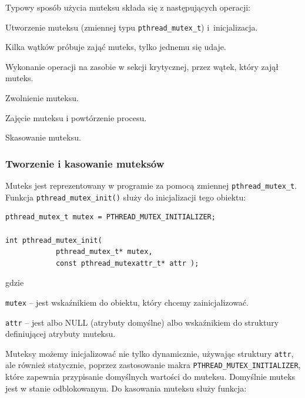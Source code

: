 Typowy sposób użycia muteksu składa się z następujących operacji: 

\begin{myenumerate} 
\item Utworzenie muteksu (zmiennej typu \lstinline[style=MyCStyle]{pthread_mutex_t}) i~inicjalizacja.
\item Kilka wątków próbuje zająć muteks, tylko jednemu się udaje. 
\item Wykonanie operacji na zasobie w sekcji krytycznej, przez wątek, który zajął muteks. 
\item Zwolnienie muteksu.
\item Zajęcie muteksu i powtórzenie procesu.
\item Skasowanie muteksu.
\end{myenumerate} 

\subsubsection{Tworzenie i kasowanie muteksów}

Muteks jest reprezentowany w programie za pomocą zmiennej \lstinline[style=MyCStyle]{pthread_mutex_t}. Funkcja \lstinline[style=MyCStyle]{pthread_mutex_init()} służy do inicjalizacji tego obiektu:

\begin{lstlisting}[style=MyCStyle]
pthread_mutex_t mutex = PTHREAD_MUTEX_INITIALIZER;

int pthread_mutex_init(
            pthread_mutex_t* mutex,
            const pthread_mutexattr_t* attr );
\end{lstlisting}


gdzie 
\begin{myitemize}
\item \lstinline[style=MyCStyle]{mutex} -- jest wskaźnikiem do obiektu, który chcemy zainicjalizować. 
\item \lstinline[style=MyCStyle]{attr} -- jest albo NULL (atrybuty domyślne) albo wskaźnikiem do struktury definiującej atrybuty muteksu.  
\end{myitemize}

Muteksy możemy inicjalizować nie tylko dynamicznie, używając struktury \lstinline[style=MyCStyle]{attr}, ale również  statycznie, poprzez zastosowanie makra \lstinline[style=MyCStyle]{PTHREAD_MUTEX_INITIALIZER}, które zapewnia przypisanie domyślnych wartości do muteksu. Domyślnie muteks jest w stanie odblokowanym. 
Do kasowania muteksu służy funkcja:

